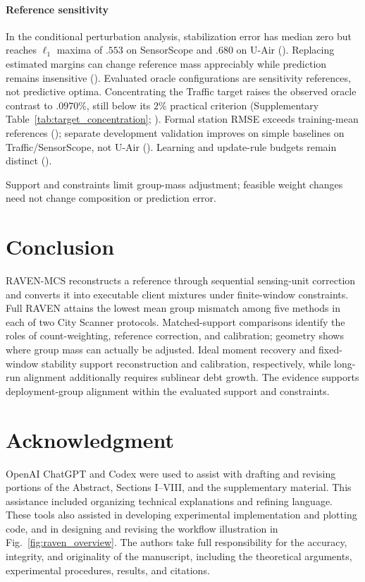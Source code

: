\documentclass[letterpaper,journal]{IEEEtran}
\begin{document}
\paragraph{Reference sensitivity}
In the conditional perturbation analysis, stabilization error has median zero
but reaches $\ell_1$ maxima of $.553$ on SensorScope and $.680$ on U-Air (). Replacing estimated margins
can change reference mass appreciably while prediction remains insensitive
().
Evaluated oracle configurations are sensitivity references, not predictive
optima. Concentrating the Traffic target raises the observed oracle contrast
to $.0970\%$, still below its $2\%$ practical criterion
(Supplementary Table~\ref{tab:target_concentration}; ).
Formal station RMSE exceeds training-mean references
(); separate development validation
improves on simple baselines on Traffic/SensorScope, not U-Air
().
Learning and update-rule budgets remain distinct
().

Support and constraints limit group-mass adjustment; feasible weight changes
need not change composition or prediction error.

\section{Conclusion}
\label{sec:conclusion}

RAVEN-MCS reconstructs a reference through sequential sensing-unit correction
and converts it into executable client mixtures under finite-window
constraints. Full RAVEN attains the lowest mean group mismatch among five
methods in each of two City Scanner protocols. Matched-support comparisons
identify the roles of count-weighting, reference correction, and calibration;
geometry shows where group mass can actually be adjusted. Ideal moment
recovery and fixed-window stability support reconstruction and calibration,
respectively, while long-run alignment additionally requires sublinear debt
growth. The evidence supports deployment-group alignment within the evaluated
support and constraints.

\section*{Acknowledgment}

OpenAI ChatGPT and Codex were used to assist with drafting and
revising portions of the Abstract, Sections I--VIII, and the
supplementary material. This assistance included organizing
technical explanations and refining language. These tools also
assisted in developing experimental implementation and plotting
code, and in designing and revising the workflow illustration
in Fig.~\ref{fig:raven_overview}. The authors take full
responsibility for the accuracy, integrity, and originality
of the manuscript, including the theoretical arguments,
experimental procedures, results, and citations.
\end{document}

